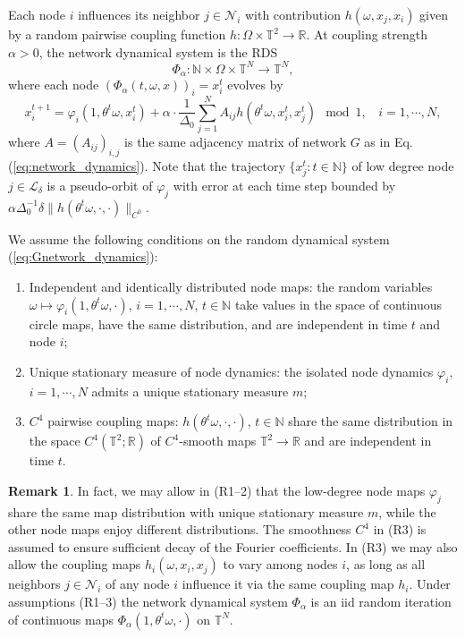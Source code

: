 \documentclass[a4paper]{article}
\theoremstyle{plain}
\theoremstyle{definition}
\newtheorem{rem}[theorem]{Remark}
\newcommand{\R}{\mathbb{R}}
\newcommand{\T}{\mathbb{T}}
\newcommand{\N}{\mathbb{N}}
\newcommand{\Lil}{\mathcal{L}}
\newcommand{\Nil}{\mathcal{N}}
\begin{document}
Each node $i$ influences its neighbor $j\in\Nil_i$ with contribution $h(\omega,x_j,x_i)$ given by a random pairwise coupling function $h:\Omega\times\T^2\to\R$. At coupling strength $\alpha>0$, the network dynamical system is the RDS
\begin{equation}\label{eq:Gnetwork_dynamics}
	\Phi_{\alpha}:\N\times\Omega\times \T^N\to\T^N,
\end{equation}
where each node $(\Phi_{\alpha}(t,\omega,x))_i=x_i^t$ evolves by
\begin{equation}\label{eq:Ghub_dynamics}
	x_i^{t+1} = \varphi_i(1,\theta^t\omega,x_i^t) + \alpha\cdot \frac{1}{\Delta_0} \sum_{j=1}^N A_{ij}h(\theta^t\omega,x_i^t,x_j^t)\mod 1,~~~~i=1,\cdots,N,
\end{equation}
where $A=(A_{ij})_{i,j}$ is the same adjacency matrix of network $G$ as in Eq. (\ref{eq:network_dynamics}).
Note that the trajectory $\{x_j^t:t\in\N\}$ of low degree node $j\in\Lil_{\delta}$ is a pseudo-orbit of $\varphi_j$ with error at each time step bounded by $\alpha\Delta_0^{-1} \delta \|h(\theta^t\omega,\cdot,\cdot)\|_{C^0}$.



We assume the following conditions on the random dynamical system (\ref{eq:Gnetwork_dynamics}):
\begin{enumerate}
	\item[(R1)] Independent and identically distributed node maps: the random variables $\omega\mapsto \varphi_i(1,\theta^t\omega,\cdot)$, $i=1,\cdots,N$, $t\in\N$ take values in the space of continuous circle maps, have the same distribution, and are independent in time $t$ and node $i$; 
	
	\item[(R2)] Unique stationary measure of node dynamics: the isolated node dynamics $\varphi_i$, $i=1,\cdots,N$ admits a unique stationary measure $m$;
	
	\item[(R3)] $C^4$ pairwise coupling maps: $h(\theta^t\omega,\cdot,\cdot)$, $t\in\N$ share the same distribution in the space $ C^4(\T^2;\R)$ of $C^4$-smooth maps $\T^2\to\R$ and are independent in time $t$. 
\end{enumerate}


\begin{rem}
	In fact, we may allow in (R1--2) that the low-degree node maps $\varphi_j$ share the same map distribution with unique stationary measure $m$, while the other node maps enjoy different distributions. The smoothness $C^4$ in (R3) is assumed to ensure sufficient decay of the Fourier coefficients.  In (R3) we may also allow the coupling maps $h_i(\omega,x_i,x_j)$ to vary among nodes $i$, as long as all neighbors $j\in\Nil_i$ of any node $i$ influence it via the same coupling map $h_i$.  Under assumptions (R1--3) the network dynamical system $\Phi_{\alpha}$ is an iid random iteration of continuous maps $\Phi_{\alpha}(1,\theta^t\omega,\cdot)$ on $\T^{N}$.
\end{rem}
\end{document}
